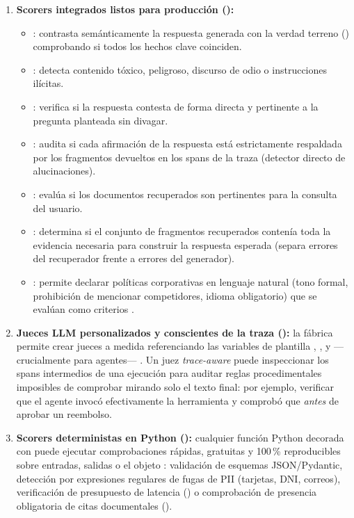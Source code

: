 \begin{enumerate}
  \item \textbf{Scorers integrados listos para producción ():}
    \begin{itemize}
      \item {}: contrasta semánticamente la respuesta generada con la verdad terreno () comprobando si todos los hechos clave coinciden.
      \item {}: detecta contenido tóxico, peligroso, discurso de odio o instrucciones ilícitas.
      \item {}: verifica si la respuesta contesta de forma directa y pertinente a la pregunta planteada sin divagar.
      \item {}: audita si cada afirmación de la respuesta está estrictamente respaldada por los fragmentos devueltos en los spans  de la traza (detector directo de alucinaciones).
      \item {}: evalúa si los documentos recuperados son pertinentes para la consulta del usuario.
      \item {}: determina si el conjunto de fragmentos recuperados contenía toda la evidencia necesaria para construir la respuesta esperada (separa errores del recuperador frente a errores del generador).
      \item {}: permite declarar políticas corporativas en lenguaje natural (tono formal, prohibición de mencionar competidores, idioma obligatorio) que se evalúan como criterios .
    \end{itemize}
  \item \textbf{Jueces LLM personalizados y conscientes de la traza ():} la fábrica  permite crear jueces a medida referenciando las variables de plantilla , ,  y ---crucialmente para agentes--- . Un juez \textit{trace-aware} puede inspeccionar los spans intermedios de una ejecución para auditar reglas procedimentales imposibles de comprobar mirando solo el texto final: por ejemplo, verificar que el agente invocó efectivamente la herramienta  y comprobó que  \emph{antes} de aprobar un reembolso.
  \item \textbf{Scorers deterministas en Python ():} cualquier función Python decorada con  puede ejecutar comprobaciones rápidas, gratuitas y 100\,\% reproducibles sobre entradas, salidas o el objeto : validación de esquemas JSON/Pydantic, detección por expresiones regulares de fugas de PII (tarjetas, DNI, correos), verificación de presupuesto de latencia () o comprobación de presencia obligatoria de citas documentales (\code{[POL-...]}).
\end{enumerate}

